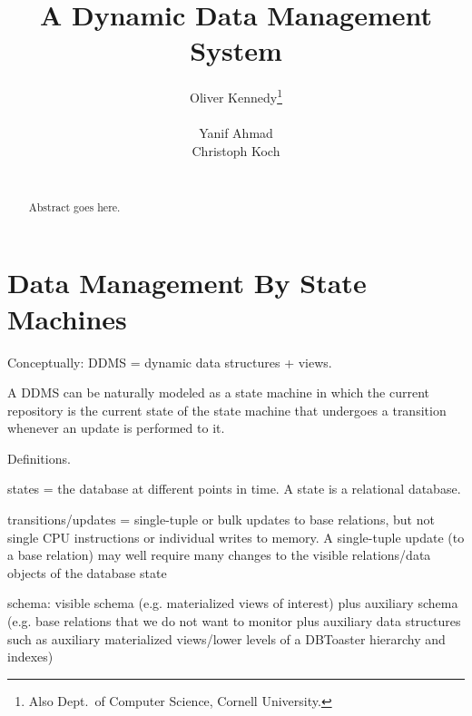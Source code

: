 \documentclass{sig-alternate}
\begin{document}
\title{A Dynamic Data Management System}
\author{
\alignauthor
Oliver Kennedy\thanks{Also Dept.\ of Computer Science, Cornell University.}\\
     \\
\alignauthor
Yanif Ahmad\\
\alignauthor
Christoph Koch\\
     \\
}
\maketitle

\begin{abstract}
Abstract goes here.
\end{abstract}



\section{Data Management By State Machines}


Conceptually: DDMS = dynamic data structures + views.



A DDMS can be naturally modeled as a state machine in which the current repository is the current state of the state machine that undergoes a transition whenever an update is performed to it.

Definitions.

states = the database at different points in time. A state is a relational database.

transitions/updates = single-tuple or bulk updates to base relations, but not single CPU instructions or individual writes to memory. A single-tuple update (to a base relation) may well require many changes to the visible relations/data objects of the database state

schema: visible schema (e.g. materialized views of interest) plus auxiliary schema (e.g. base relations that we do not want to monitor plus auxiliary data structures such as auxiliary materialized views/lower levels of a DBToaster hierarchy and indexes)
\end{document}
